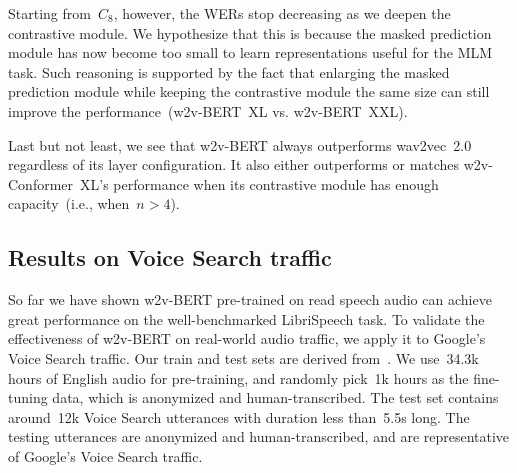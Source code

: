 \documentclass{article}
\begin{document}
Starting from~$C_{8}$, however, the WERs stop decreasing as we deepen the contrastive module.
We hypothesize that this is because the masked prediction module has now become too small to learn representations useful for the MLM task.
Such reasoning is supported by the fact that enlarging the masked prediction module while keeping the contrastive module the same size can still improve the performance~(w2v-BERT~XL vs. w2v-BERT~XXL).

Last but not least, we see that w2v-BERT always outperforms wav2vec~2.0 regardless of its layer configuration.
It also either outperforms or matches w2v-Conformer~XL's performance when its contrastive module has enough capacity~(i.e., when~$n > 4$).



\subsection{Results on Voice Search traffic}




So far we have shown w2v-BERT pre-trained on read speech audio can achieve great performance on the well-benchmarked LibriSpeech task.
To validate the effectiveness of w2v-BERT on real-world audio traffic, we apply it to Google's Voice Search traffic.
Our train and test sets are derived from~\cite{li2021scaling}.
We use~34.3k hours of English audio for pre-training, and randomly pick~1k hours as the fine-tuning data, which is anonymized and human-transcribed.
The test set contains around~12k Voice Search utterances with duration less than~5.5s long.
The testing utterances are anonymized and human-transcribed, and are representative of Google’s Voice Search traffic.
\end{document}
